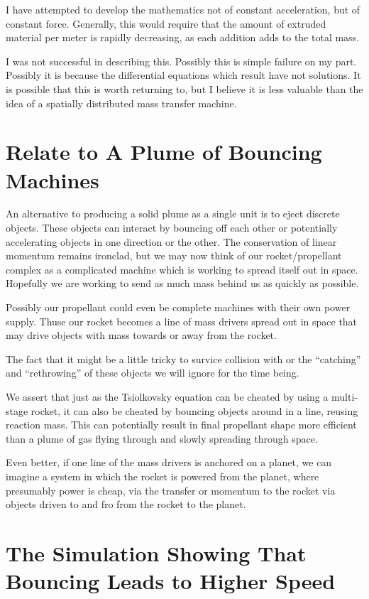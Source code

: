 \documentclass[11pt]{article}
\begin{document}
I have attempted to develop the mathematics not of constant acceleration, but of constant force.
Generally, this would require that the amount of extruded material per meter is rapidly decreasing,
as each addition adds to the total mass.

I was not successful in describing this.  Possibly this is simple failure on my part.
Possibly it is because the differential equations which result have not solutions.
It is possible that this is worth returning to, but I believe it is less valuable than
the idea of a spatially distributed mass transfer machine.

\section{Relate to A Plume of Bouncing Machines}

An alternative to producing a solid plume as a single unit is to eject discrete objects.
These objects can interact by bouncing off each other or potentially accelerating objects
in one direction or the other.  The conservation of linear momentum remains ironclad,
but we may now think of our rocket/propellant complex as a complicated machine which
is working to spread itself out in space. Hopefully we are working to send as much
mass behind us as quickly as possible.

Possibly our propellant could even be complete machines with their own power supply.
Thuse our rocket becomes a line of mass drivers spread out in space that may drive
objects with mass towards or away from the rocket.

The fact that it might be a little tricky to survice collision with or the ``catching'' and
``rethrowing'' of these objects we will ignore for the time being.

We assert that just as the Tsiolkovsky equation can be cheated by using a multi-stage
rocket, it can also be cheated by bouncing objects around in a line, reusing reaction mass.
This can potentially result in final propellant shape more efficient than a plume of
gas flying through and slowly spreading through space.

Even better, if one line of the mass drivers is anchored on a planet, we can
imagine a system in which the rocket is powered from the planet, where presumably power
is cheap, via the transfer or momentum to the rocket via objects driven to and fro from
the rocket to the planet.

\section{The Simulation Showing That Bouncing Leads to Higher Speed}
\end{document}
